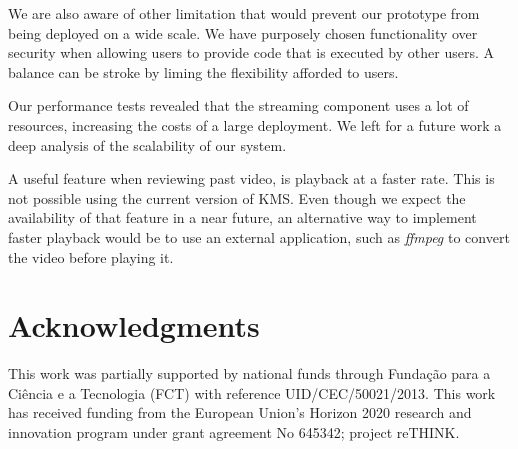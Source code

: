 \documentclass[10pt,conference]{IEEEtran}
\begin{document}
We are also aware of other limitation that would prevent our prototype from being deployed on a wide scale.
We have purposely chosen functionality over security when allowing users to provide code that is executed by other users.
A balance can be stroke by liming the flexibility afforded to users.

Our performance tests revealed that the streaming component uses a lot of resources, increasing the costs of a large deployment.
We left for a future work a deep analysis of the scalability of our system.

A useful feature when reviewing past video, is playback at a faster rate.
This is not possible using the current version of \gls{KMS}.
Even though we expect the availability of that feature in a near future, an alternative way to implement faster playback would be to use an external application, such as \emph{ffmpeg} to convert the video before playing it.

\section*{Acknowledgments}

This work was partially supported by national funds through Fundação para a Ciência e a Tecnologia (FCT) with reference UID/CEC/50021/2013.
This work has received funding from the European Union’s Horizon 2020 research and innovation program under grant agreement No 645342; project reTHINK.





\end{document}
